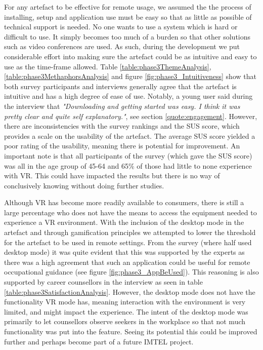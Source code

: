 For any artefact to be effective for remote usage, we assumed the the process of installing, setup and application use must be easy so that as little as possible of technical support is needed. No one wants to use a system which is hard or difficult to use. It simply becomes too much of a burden so that other solutions such as video conferences are used. As such, during the development we put considerable effort into making sure the artefact could be as intuitive and easy to use as the time-frame allowed. Table \ref{table:phase3ThemeAnalysis}, \ref{table:phase3MethaphorsAnalysis} and figure \ref{fig:phase3_Intuitiveness} show that both survey participants and interviews generally agree that the artefact is intuitive and has a high degree of ease of use. Notably, a young user said during the interview that \textit{"Downloading and getting started was easy. I think it was pretty clear and quite self explanatory."}, see section \ref{quote:engagement}. However, there are inconsistencies with the survey rankings and the SUS score, which provides a scale on the usability of the artefact. The average  SUS score yielded a poor rating of the usability, meaning there is potential for improvement. An important note is that all participants of the survey (which gave the SUS score) was all in the age group of 45-64 and 65\% of those had little to none experience with VR. This could have impacted the results but there is no way of conclusively knowing without doing further studies.   


Although VR has become more readily available to consumers, there is still a large percentage who does not have the means to access the equipment needed to experience a VR environment. With the inclusion of the desktop mode in the artefact and through gamification principles we attempted to lower the threshold for the artefact to be used in remote settings. From the survey (where half used desktop mode) it was quite evident that this was supported by the experts as there was a high agreement that such an application could be useful for remote occupational guidance (see figure \ref{fig:phase3_AppBeUsed}). This reasoning is also supported by career counsellors in the interview as seen in table \ref{table:phase3SatisfactionAnalysis}. However, the desktop mode does not have the functionality VR mode has, meaning interaction with the environment is very limited, and might impact the experience. The intent of the desktop mode was primarily to let counsellors observe seekers in the workplace so that not much functionality was put into the feature. Seeing its potential this could be improved further and perhaps become part of a future IMTEL project. 



